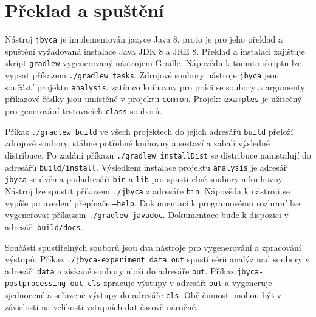 \section{Překlad a spuštění}\label{ToolRun}

Nástroj \texttt{jbyca} je implementován jazyce Java 8, proto je pro jeho překlad a spuštění vyžadovaná instalace Java JDK 8 a JRE 8.
Překlad a instalaci zajišťuje skript \texttt{gradlew} vygenerovaný nástrojem Gradle. Nápovědu k tomuto skriptu lze vypsat příkazem \texttt{./gradlew tasks}. 
Zdrojové soubory nástroje \texttt{jbyca} jsou součástí projektu \texttt{analysis}, zatímco knihovny pro práci se soubory a argumenty příkazové řádky jsou umístěné v projektu \texttt{common}. Projekt \texttt{examples} je užitečný pro generování testovacích \texttt{class} souborů.

Příkaz \texttt{./gradlew build} ve všech projektech do jejich adresářů \texttt{build} přeloží zdrojové soubory, stáhne potřebné knihovny a sestaví a zabalí výsledné distribuce. Po zadání příkazu \texttt{./gradlew installDist} se distribuce nainstalují do adresářů \texttt{build/install}. Výsledkem instalace projektu \texttt{analysis} je adresář \texttt{jbyca} se dvěma podadresáři \texttt{bin} a \texttt{lib} pro spustitelné soubory a knihovny. Nástroj lze spustit příkazem \texttt{./jbyca} z adresáře \texttt{bin}. Nápověda k nástroji se vypíše po uvedení přepínače \texttt{---help}. Dokumentaci k programovému rozhraní lze vygenerovat příkazem \texttt{./gradlew javadoc}. Dokumentace bude k dispozici v adresáři \texttt{build/docs}.

Součástí spustitelných souborů jsou dva nástroje pro vygenerování a zpracování výstupů. Příkaz \texttt{./jbyca-experiment data out} spustí sérii analýz nad soubory v adresáři \texttt{data} a získané soubory uloží do adresáře \texttt{out}. Příkaz \texttt{jbyca-postprocessing out cls} zpracuje výstupy v adresáři \texttt{out} a vygeneruje sjednocené a seřazené výstupy do adresáře \texttt{cls}. Obě činnosti mohou být v závislosti na velikosti vstupních dat časově náročné.







